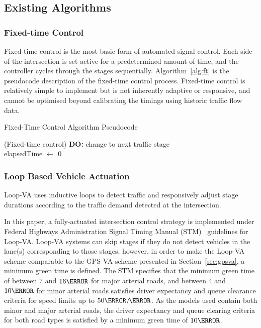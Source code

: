 \documentclass[numbered]{trbunofficial}
\newcommand{\sidiv}{/\hspace{-1.5pt}} %
\begin{document}
\subsection{Existing Algorithms}
\subsubsection{Fixed-time Control}
Fixed-time control is the most basic form of automated signal control. Each side of the intersection is set active for a predetermined amount of time, and the controller cycles through the stages sequentially. Algorithm~\ref{alg:ft} is the pseudocode description of the fixed-time control process. Fixed-time control is relatively simple to implement but is not inherently adaptive or responsive, and cannot be optimised beyond calibrating the timings using historic traffic flow data.


\begin{algorithm}[h]
	\caption{Fixed-Time Control Algorithm Pseudocode}
	\label{alg:ft}
	\SetAlgoVlined
	\SetVlineSkip{3pt}
	\Begin(Fixed-time control){
		{ 
			\textbf{DO:} change to next traffic stage\\
			elapsedTime $\gets$ 0
		}
	}
\end{algorithm}
\setlength{\textfloatsep}{2pt}

\subsubsection{Loop Based Vehicle Actuation} \label{sec:va}
Loop-VA uses inductive loops \cite{Yauch1990} to detect traffic and responsively adjust stage durations according to the traffic demand detected at the intersection.

In this paper, a fully-actuated intersection control strategy is implemented under Federal Highways Administration Signal Timing Manual (STM)~\cite{theSTM2008} guidelines for Loop-VA. Loop-VA systems can skip stages if they do not detect vehicles in the lane(s) corresponding to those stages; however, in order to make the Loop-VA scheme comparable to the GPS-VA scheme presented in Section~\ref{sec:gpsva}, a minimum green time is defined. 
The STM specifies that the minimum green time of between $7$ and $16\s$ for major arterial roads, and between $4$ and $10\s$ for minor arterial roads satisfies driver expectancy and queue clearance criteria for speed limits up to $50\km\sidiv\hour$. As the models used contain both minor and major arterial roads, the driver expectancy and queue clearing criteria for both road types is satisfied by a minimum green time of $10\s$.
\end{document}
